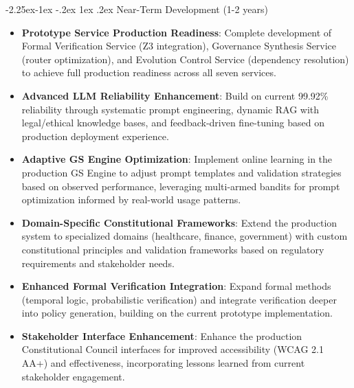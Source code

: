 \documentclass[manuscript,screen,9pt]{acmart}
\makeatletter
\renewcommand\subsection{\@startsection{subsection}{2}{\z@}%
  {-2.25ex\@plus -1ex \@minus -.2ex}%
  {1ex \@plus .2ex}%
  {\normalfont\large\bfseries}}
\makeatother
\begin{document}
\subsection{Near-Term Development (1-2 years)}
\label{subsec:near_term_research}
\begin{itemize}[leftmargin=*,itemsep=1pt,parsep=1pt]
	\item \textbf{Prototype Service Production Readiness}: Complete development of Formal Verification Service (Z3 integration), Governance Synthesis Service (router optimization), and Evolution Control Service (dependency resolution) to achieve full production readiness across all seven services.
	\item \textbf{Advanced LLM Reliability Enhancement}: Build on current 99.92\% reliability through systematic prompt engineering, dynamic RAG with legal/ethical knowledge bases, and feedback-driven fine-tuning based on production deployment experience.
	\item \textbf{Adaptive GS Engine Optimization}: Implement online learning in the production GS Engine to adjust prompt templates and validation strategies based on observed performance, leveraging multi-armed bandits for prompt optimization informed by real-world usage patterns.
	\item \textbf{Domain-Specific Constitutional Frameworks}: Extend the production system to specialized domains (healthcare, finance, government) with custom constitutional principles and validation frameworks based on regulatory requirements and stakeholder needs.
	\item \textbf{Enhanced Formal Verification Integration}: Expand formal methods (temporal logic, probabilistic verification) and integrate verification deeper into policy generation, building on the current prototype implementation.
	\item \textbf{Stakeholder Interface Enhancement}: Enhance the production Constitutional Council interfaces for improved accessibility (WCAG 2.1 AA+) and effectiveness, incorporating lessons learned from current stakeholder engagement.
\end{itemize}
\end{document}
